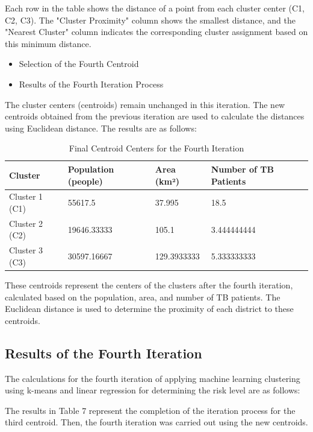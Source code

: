 \documentclass[conference]{IEEEtran}
\begin{document}
Each row in the table shows the distance of a point from each cluster center (C1, C2, C3). The "Cluster Proximity" column shows the smallest distance, and the "Nearest Cluster" column indicates the corresponding cluster assignment based on this minimum distance.
\begin{itemize}
    \item Selection of the Fourth Centroid
    \item Results of the Fourth Iteration Process
\end{itemize}



The cluster centers (centroids) remain unchanged in this iteration. The new centroids obtained from the previous iteration are used to calculate the distances using Euclidean distance. The results are as follows:

\begin{table}[h]
\centering
\begin{tabularx}{\linewidth}{|X|X|X|X|}
\hline
\textbf{Cluster} & \textbf{Population (people)} & \textbf{Area (km²)} & \textbf{Number of TB Patients} \\ \hline
Cluster 1 (C1) & 55617.5 & 37.995 & 18.5 \\ \hline
Cluster 2 (C2) & 19646.33333 & 105.1 & 3.444444444 \\ \hline
Cluster 3 (C3) & 30597.16667 & 129.3933333 & 5.333333333 \\ \hline
\end{tabularx}
\caption{Final Centroid Centers for the Fourth Iteration}
\label{tab:my_label}
\end{table}

These centroids represent the centers of the clusters after the fourth iteration, calculated based on the population, area, and number of TB patients. The Euclidean distance is used to determine the proximity of each district to these centroids.

\subsection{Results of the Fourth Iteration}
The calculations for the fourth iteration of applying machine learning clustering using k-means and linear regression for determining the risk level are as follows:

The results in Table 7 represent the completion of the iteration process for the third centroid. Then, the fourth iteration was carried out using the new centroids.
\end{document}
